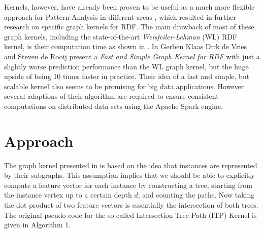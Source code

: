 \documentclass{easychair}
\begin{document}
Kernels, however, have already been proven to be useful as a much more flexible approach for Pattern Analysis in different areas \cite{Shawe-Taylor2004}, which resulted in further research on specific graph kernels for RDF. The main drawback of most of these graph kernels, including the state-of-the-art \textit{Weisfeiler-Lehman} (WL) RDF kernel, is their computation time as shown in \cite{deVries2013}. In \cite{FGK} Gerben Klaas Dirk de Vries and Steven de Rooij present a \textit{Fast and Simple Graph Kernel for RDF} with just a slightly worse prediction performance than the WL graph kernel, but the huge upside of being 10 times faster in practice. Their idea of a fast and simple, but scalable kernel also seems to be promising for big data applications. However several adaptions of their algorithm are required to ensure consistent computations on distributed data sets using the Apache Spark engine.

\section{Approach}
\label{sect:Approach}

The graph kernel presented in \cite{FGK} is based on the idea that instances are represented by their subgraphs. This assumption implies that we should be able to explicitly compute a feature vector for each instance by constructing a tree, starting from the instance vertex up to a certain depth $d$, and counting the paths. Now taking the dot product of two feature vectors is essentially the intersection of both trees. The original pseudo-code for the so called Intersection Tree Path (ITP) Kernel is given in Algorithm 1.
\end{document}
